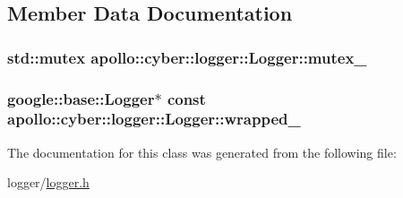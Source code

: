 \subsection{Member Data Documentation}
\hypertarget{classapollo_1_1cyber_1_1logger_1_1Logger_a127c753b55ea9542c8b88882fd4c0b2e}{
\subsubsection[{mutex\-\_\-}]{\setlength{\rightskip}{0pt plus 5cm}std\-::mutex apollo\-::cyber\-::logger\-::\-Logger\-::mutex\-\_\-\hspace{0.3cm}{\ttfamily [private]}}}\label{classapollo_1_1cyber_1_1logger_1_1Logger_a127c753b55ea9542c8b88882fd4c0b2e}
\hypertarget{classapollo_1_1cyber_1_1logger_1_1Logger_a80db29c400adaba27edbe8a1aec55f90}{
\subsubsection[{wrapped\-\_\-}]{\setlength{\rightskip}{0pt plus 5cm}google\-::base\-::\-Logger$\ast$ const apollo\-::cyber\-::logger\-::\-Logger\-::wrapped\-\_\-\hspace{0.3cm}{\ttfamily [private]}}}\label{classapollo_1_1cyber_1_1logger_1_1Logger_a80db29c400adaba27edbe8a1aec55f90}


The documentation for this class was generated from the following file\-:\begin{DoxyCompactItemize}
\item 
logger/\hyperlink{logger_8h}{logger.\-h}\end{DoxyCompactItemize}
